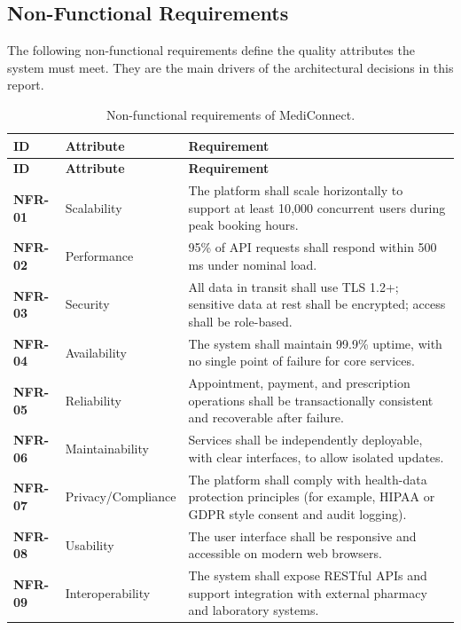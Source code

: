 \documentclass[12pt,a4paper]{article}
\begin{document}
\subsection{Non-Functional Requirements}
The following non-functional requirements define the quality attributes the system must meet.
They are the main drivers of the architectural decisions in this report.
\begin{longtable}{>{\bfseries}p{1.6cm} p{3.2cm} p{8.2cm}}
\caption{Non-functional requirements of MediConnect.}\\
\toprule
\textbf{ID} & \textbf{Attribute} & \textbf{Requirement}\\
\midrule
\endfirsthead
\toprule
\textbf{ID} & \textbf{Attribute} & \textbf{Requirement}\\
\midrule
\endhead
NFR-01 & Scalability & The platform shall scale horizontally to support at least 10{,}000
concurrent users during peak booking hours.\\
NFR-02 & Performance & 95\% of API requests shall respond within 500\,ms under nominal load.\\
NFR-03 & Security & All data in transit shall use TLS 1.2+; sensitive data at rest shall be
encrypted; access shall be role-based.\\
NFR-04 & Availability & The system shall maintain 99.9\% uptime, with no single point of
failure for core services.\\
NFR-05 & Reliability & Appointment, payment, and prescription operations shall be
transactionally consistent and recoverable after failure.\\
NFR-06 & Maintainability & Services shall be independently deployable, with clear interfaces,
to allow isolated updates.\\
NFR-07 & Privacy/Compliance & The platform shall comply with health-data protection
principles (for example, HIPAA or GDPR style consent and audit logging).\\
NFR-08 & Usability & The user interface shall be responsive and accessible on modern web
browsers.\\
NFR-09 & Interoperability & The system shall expose RESTful APIs and support integration
with external pharmacy and laboratory systems.\\
\bottomrule
\end{longtable}
\end{document}
